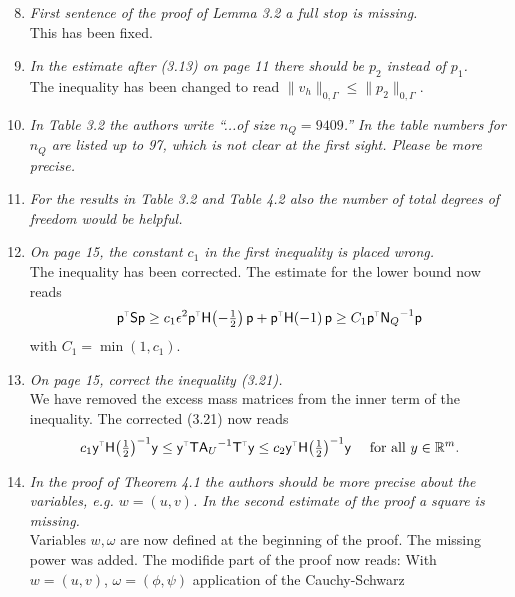 \documentclass[10pt, a4paper]{article}
\newcommand*{\Scale}[2][4]{\scalebox{#1}{$#2$}}%
\newcommand{\reals}{\mathbb{R}}
\newcommand{\norm}[1]{\lVert#1\rVert}
\newcommand{\open}[1]{\left(#1\right)}
\newcommand{\Amat}{\ensuremath{\mathsf{A}}}
\newcommand{\Tmat}{\ensuremath{\mathsf{T}}}
\newcommand{\Hmat}[1]{\ensuremath{\mathsf{H}\!\left(#1\right)}}
\newcommand{\mat}[1]{\ensuremath{\mathsf{#1}}}
\newcommand{\inv}[1]{\ensuremath{{#1}^{-1}}}
\newcommand{\transp}[1]{\ensuremath{{#1}^{\Scale[0.5]{\top}}}}
\renewcommand{\vec}[1]{\mat{#1}}
\begin{document}
\begin{enumerate}
\setcounter{enumi}{7}
  \item{\textit{First sentence of the proof of Lemma 3.2 a full stop is missing.}\\
    This has been fixed.
}
  \item{\textit{In the estimate after (3.13) on page 11 there should be $p_2$
    instead of $p_1$.}\\
    The inequality has been changed to read $\norm{v_h}_{0, \Gamma}\leq
    \norm{p_2}_{0, \Gamma}$.
}
  \item{\textit{In Table 3.2 the authors write ``...of size $n_Q=9409$.'' In the
    table numbers for $n_Q$ are listed up to 97, which is not clear at the first
    sight. Please be more precise.}
}
  \item{\textit{For the results in Table 3.2 and Table 4.2 also the number of
    total degrees of freedom would be helpful.}
}
  \item{\textit{On page 15, the constant $c_1$ in the first inequality is placed
    wrong.}\\
    The inequality has been corrected. The estimate for the lower bound now reads
  \[
  \transp{\vec{p}} \mat{S} \vec{p}
  \geq
    c_1\epsilon^2\transp{\vec{p}} \Hmat{-\tfrac{1}{2}} \vec{p} + 
  \transp{\vec{p}} \Hmat{-1} \vec{p}\\
  \geq 
  C_1 \transp{\vec{p}} \inv{\mat{N}_Q} \vec{p}
  \]
  with $C_1=\min\open{1, c_1}$.\qquad
}
  \item{\textit{On page 15, correct the inequality (3.21).}\\
    We have removed the excess mass matrices from the inner term of the
    inequality. The corrected (3.21) now reads
  \begin{equation}
    c_1\transp{\vec{y}} \inv{\Hmat{\tfrac{1}{2}}} \vec{y}
    \leq
    \transp{\vec{y}} \Tmat\inv{\Amat_{{U}}}\transp{\Tmat} \vec{y}
    \leq      
    c_2\transp{\vec{y}} \inv{\Hmat{\tfrac{1}{2}}} \vec{y}
    \quad \text{ for all } y \in \reals^{m}.
  \end{equation}
}
  \item{\textit{In the proof of Theorem 4.1 the authors should be more precise
    about the variables, e.g. $w=(u, v)$. In the second estimate of the proof a
    square is missing.}\\
    Variables $w, \omega$ are now defined at the beginning of the proof. The
    missing power was added. The modifide part of the proof now reads:
    With $w=(u, v)$, $\omega=(\phi, \psi)$ application of the Cauchy-Schwarz 
}
\end{enumerate}
\end{document}
